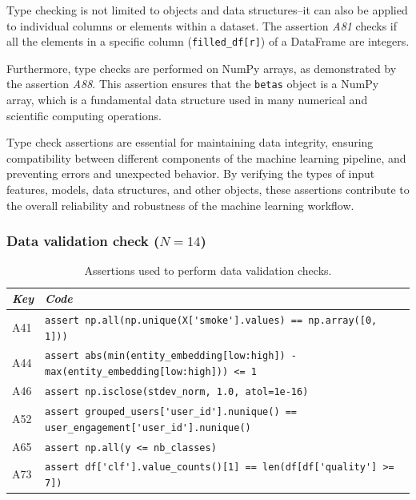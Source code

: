Type checking is not limited to objects and data structures--it can also be applied to individual columns or elements within a dataset. The assertion \emph{A81} checks if all the elements in a specific column (\lstinline[]$filled_df[r]$) of a DataFrame are integers.

Furthermore, type checks are performed on NumPy arrays, as demonstrated by the assertion \emph{A88}. This assertion ensures that the \lstinline{betas} object is a NumPy array, which is a fundamental data structure used in many numerical and scientific computing operations.

Type check assertions are essential for maintaining data integrity, ensuring compatibility between different components of the machine learning pipeline, and preventing errors and unexpected behavior. By verifying the types of input features, models, data structures, and other objects, these assertions contribute to the overall reliability and robustness of the machine learning workflow.


\subsubsection{Data validation check ($N = 14$)}

\begin{table}
  \centering
  \caption{Assertions used to perform data validation checks.}
  \begin{tabular}{@{}m{} m{}@{}}
    \toprule
    \emph{\textbf{Key}}&
    \emph{\textbf{Code}}\\
    \midrule

    A41 &
    \lstinline[]$assert np.all(np.unique(X['smoke'].values) == np.array([0, 1]))$\\

    A44 &
    \lstinline[]$assert abs(min(entity_embedding[low:high]) - max(entity_embedding[low:high])) <= 1$\\

    A46 &
    \lstinline[]$assert np.isclose(stdev_norm, 1.0, atol=1e-16)$\\

    A52 &
    \lstinline[]$assert grouped_users['user_id'].nunique() == user_engagement['user_id'].nunique()$\\

    A65 &
    \lstinline[]$assert np.all(y <= nb_classes)$\\

    A73 &
    \lstinline[]$assert df['clf'].value_counts()[1] == len(df[df['quality'] >= 7])$\\
    \bottomrule
  \end{tabular}
  \label{tab:data-validation}
\end{table}

